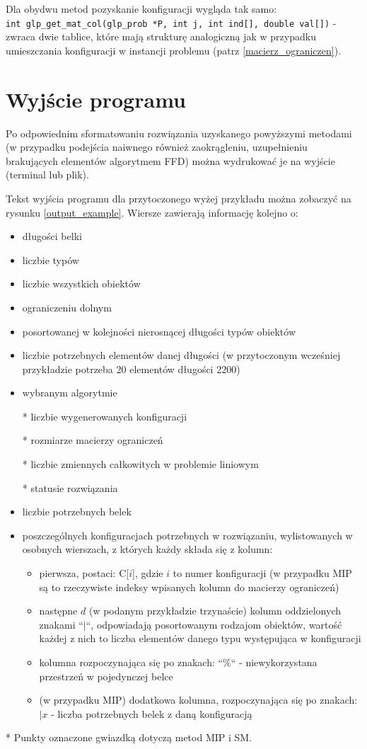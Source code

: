 Dla obydwu metod pozyskanie konfiguracji wygląda tak samo: \\
\verb|int glp_get_mat_col(glp_prob *P, int j, int ind[], double val[])| - zwraca dwie tablice, które mają strukturę analogiczną jak w przypadku umieszczania konfiguracji w instancji problemu (patrz \ref{macierz_ograniczen}). \\

\section{Wyjście programu}
Po odpowiednim sformatowaniu rozwiązania uzyskanego powyższymi metodami (w przypadku podejścia naiwnego również zaokrągleniu, uzupełnieniu brakujących elementów algorytmem FFD) można wydrukować je na wyjście (terminal lub plik).

Tekst wyjścia programu dla przytoczonego wyżej przykładu można zobaczyć na rysunku \ref{output_example}. 
Wiersze zawierają informację kolejno o: 
\begin{itemize}
	\item długości belki
	\item liczbie typów
	\item liczbie wszystkich obiektów
	\item ograniczeniu dolnym
	\item posortowanej w kolejności nierosnącej długości typów obiektów
	\item liczbie potrzebnych elementów danej długości (w przytoczonym wcześniej przykładzie potrzeba 20 elementów długości 2200)
	\item wybranym algorytmie
	\item[*] liczbie wygenerowanych konfiguracji
	\item[*] rozmiarze macierzy ograniczeń
	\item[*] liczbie zmiennych całkowitych w problemie liniowym
	\item[*] statusie rozwiązania
	\item liczbie potrzebnych belek
	\item poszczególnych konfiguracjach potrzebnych w rozwiązaniu, wylistowanych w osobnych wierszach, z których każdy składa się z kolumn:
	\begin{itemize}
		\item  pierwsza, postaci: C[$i$], gdzie $i$ to numer konfiguracji (w przypadku MIP są to rzeczywiste indeksy wpisanych kolumn do macierzy ograniczeń)
		\item następne $d$ (w podanym przykładzie trzynaście) kolumn oddzielonych znakami ``$|$``, odpowiadają posortowanym rodzajom obiektów, wartość każdej z nich to liczba elementów danego typu występująca w konfiguracji
		\item kolumna rozpoczynająca się po znakach: ``$\%$`` - niewykorzystana przestrzeń w pojedynczej belce
		\item (w przypadku MIP) dodatkowa kolumna, rozpoczynająca się po znakach: $|x$ - liczba potrzebnych belek z daną konfiguracją
	\end{itemize}
\end{itemize}
* Punkty oznaczone gwiazdką dotyczą metod MIP i SM.

